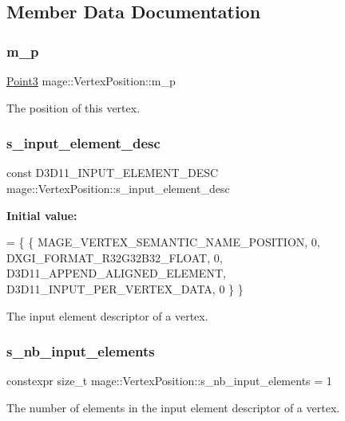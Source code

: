 \subsection{Member Data Documentation}
\hypertarget{structmage_1_1_vertex_position_af752daea9af1272dba3d3da256e0aaa2}{}\label{structmage_1_1_vertex_position_af752daea9af1272dba3d3da256e0aaa2} 
\subsubsection{\texorpdfstring{m\+\_\+p}{m\_p}}
{\footnotesize\ttfamily \hyperlink{structmage_1_1_point3}{Point3} mage\+::\+Vertex\+Position\+::m\+\_\+p}

The position of this vertex. \hypertarget{structmage_1_1_vertex_position_a4e43cd06303beccd4791fdec9a13c47f}{}\label{structmage_1_1_vertex_position_a4e43cd06303beccd4791fdec9a13c47f} 
\subsubsection{\texorpdfstring{s\+\_\+input\+\_\+element\+\_\+desc}{s\_input\_element\_desc}}
{\footnotesize\ttfamily const D3\+D11\+\_\+\+I\+N\+P\+U\+T\+\_\+\+E\+L\+E\+M\+E\+N\+T\+\_\+\+D\+E\+SC mage\+::\+Vertex\+Position\+::s\+\_\+input\+\_\+element\+\_\+desc\hspace{0.3cm}{\ttfamily [static]}}

{\bfseries Initial value\+:}
\begin{DoxyCode}
= \{
        \{ MAGE\_VERTEX\_SEMANTIC\_NAME\_POSITION, 0, DXGI\_FORMAT\_R32G32B32\_FLOAT,    0, 
      D3D11\_APPEND\_ALIGNED\_ELEMENT, D3D11\_INPUT\_PER\_VERTEX\_DATA, 0 \}
    \}
\end{DoxyCode}
The input element descriptor of a vertex. \hypertarget{structmage_1_1_vertex_position_a250e2e24576b67c4970717a1419af9e2}{}\label{structmage_1_1_vertex_position_a250e2e24576b67c4970717a1419af9e2} 
\subsubsection{\texorpdfstring{s\+\_\+nb\+\_\+input\+\_\+elements}{s\_nb\_input\_elements}}
{\footnotesize\ttfamily constexpr size\+\_\+t mage\+::\+Vertex\+Position\+::s\+\_\+nb\+\_\+input\+\_\+elements = 1\hspace{0.3cm}{\ttfamily [static]}}

The number of elements in the input element descriptor of a vertex. 